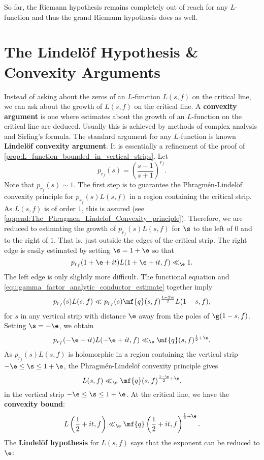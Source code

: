     So far, the Riemann hypothesis remains completely out of reach for any $L$-function and thus the grand Riemann hypothesis does as well.
  \section{The Lindel\"of Hypothesis \& Convexity Arguments}
    Instead of asking about the zeros of an $L$-function $L(s,f)$ on the critical line, we can ask about the growth of $L(s,f)$ on the critical line. A \textbf{convexity argument} is one where estimates about the growth of an $L$-function on the critical line are deduced. Usually this is achieved by methods of complex analysis and Sirling's formula. The standard argument for any $L$-function is known \textbf{Lindel\"of convexity argument}. It is essentially a refinement of the proof of \cref{prop:L_function_bounded_in_vertical_strips}. Let
    \[
      p_{r_{f}}(s) = \left(\frac{s-1}{s+1}\right)^{r_{f}}.
    \]
    Note that $p_{r_{f}}(s) \sim 1$. The first step is to guarantee the Phragm\'en-Lindel\"of convexity principle for $p_{r_{f}}(s)L(s,f)$ in a region containing the critical strip. As $L(s,f)$ is of order $1$, this is assured (see \cref{append:The_Phragmen_Lindelof_Convexity_principle}). Therefore, we are reduced to estimating the growth of $p_{r_{f}}(s)L(s,f)$ for $\s$ to the left of $0$ and to the right of $1$. That is, just outside the edges of the critical strip. The right edge is easily estimated by setting $\s = 1+\e$ so that
    \[
      p_{r_{f}}(1+\e+it)L(1+\e+it,f) \ll_{\e} 1.
    \]
    The left edge is only slightly more difficult. The functional equation and \cref{equ:gamma_factor_analytic_conductor_estimate} together imply
    \[
      p_{r_{f}}(s)L(s,f) \ll p_{r_{f}}(s)\mf{q}(s,f)^{\frac{1-2\s}{2}}L(1-s,f),
    \]
    for $s$ in any vertical strip with distance $\e$ away from the poles of $\g(1-s,f)$. Setting $\s = -\e$, we obtain
    \[
      p_{r_{f}}(-\e+it)L(-\e+it,f) \ll_{\e} \mf{q}(s,f)^{\frac{1}{2}+\e}.
    \]
    As $p_{r_{f}}(s)L(s,f)$ is holomorphic in a region containing the vertical strip $-\e \le \s \le 1+\e$, the Phragm\'en-Lindel\"of convexity principle gives
    \[
      L(s,f) \ll_{\e} \mf{q}(s,f)^{\frac{1-\s}{2}+\e},
    \]
    in the vertical strip $-\e \le \s \le 1+\e$. At the critical line, we have the \textbf{convexity bound}:
    \begin{equation}\label{equ:convexity_bound_L_function}
      L\left(\frac{1}{2}+it,f\right) \ll_{\e} \mf{q}\left(\frac{1}{2}+it,f\right)^{\frac{1}{4}+\e}.
    \end{equation}
    The \textbf{Lindel\"of hypothesis} for $L(s,f)$ says that the exponent can be reduced to $\e$:

